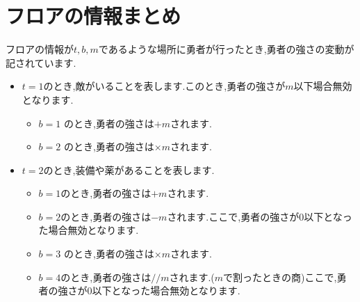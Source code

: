 \documentclass[a4paper,10pt]{ltjsarticle}
\begin{document}
\section*{フロアの情報まとめ}
フロアの情報が$t,b,m$であるような場所に勇者が行ったとき,勇者の強さの変動が記されています.
\begin{itemize}
  \item $t=1$のとき,敵がいることを表します.このとき,勇者の強さが$m$以下場合無効となります.
    \begin{itemize}
      \item $b = 1$ のとき,勇者の強さは$+m$されます.
      \item $b = 2$ のとき,勇者の強さは$\times m$されます.
    \end{itemize}
  \item $t=2$のとき,装備や薬があることを表します.
    \begin{itemize}
      \item $b = 1$のとき,勇者の強さは$+m$されます.
      \item $b = 2$のとき,勇者の強さは$-m$されます.ここで,勇者の強さが$0$以下となった場合無効となります.
      \item $b = 3$ のとき,勇者の強さは$\times m$されます.
      \item $b = 4$のとき,勇者の強さは$// m$されます.($m$で割ったときの商)ここで,勇者の強さが$0$以下となった場合無効となります.
    \end{itemize}
\end{itemize}
\end{document}
